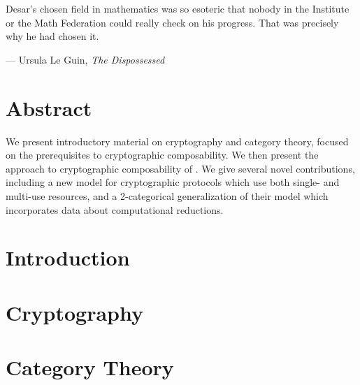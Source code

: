 \documentclass[12pt,twoside]{reedthesis}
\begin{document}


\tableofcontents

\chapter*{}
\begin{dedication}
  Desar's chosen field in mathematics was so esoteric that nobody in the
  Institute or the Math Federation could really check on his progress. That was
  precisely why he had chosen it.

  --- Ursula Le Guin, \emph{The Dispossessed}
\end{dedication}


\chapter*{Abstract}
We present introductory material on cryptography and category theory, focused on
the prerequisites to cryptographic composability. We then present the approach
to cryptographic composability of \citeauthor{broadbent-karvonen-2022}. We give
several novel contributions, including a new model for cryptographic protocols
which use both single- and multi-use resources, and a 2-categorical
generalization of their model which incorporates data about computational
reductions.

\mainmatter%
\pagestyle{fancyplain} %

\chapter*{Introduction}


\chapter{Cryptography}
\label{chap:cryptography}


\chapter{Category Theory}
\label{chap:category-theory}

\end{document}

